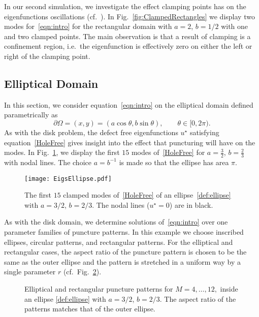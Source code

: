 \documentclass[times]{article}
\begin{document}
In our second simulation, we investigate the effect clamping points has
on the eigenfunctions oscillations (cf.~\cite{FM}). In
Fig.~\ref{fig:ClampedRectangles} we display two modes
for~\eqref{eqn:intro} for the rectangular domain with $a=2$, $b = 1/2$
with one and two clamped points. The main observation is that a result
of clamping is a confinement region, i.e.~the eigenfunction is
effectively zero on either the left or right of the clamping point.

\subsection{Elliptical Domain}
In this section, we consider equation~\eqref{eqn:intro} on the
elliptical domain defined parametrically as
\begin{equation}\label{def:ellipse}
\partial\Omega = (x,y) = (a \cos\theta,   b \sin\theta), \qquad
  \theta \in [0,2\pi).
\end{equation}
As with the disk problem, the defect free eigenfunctions $u^{\star}$
satisfying equation~\eqref{HoleFree} gives insight into the effect that
puncturing will have on the modes. In Fig.~\ref{fig:NoHolesEllipse}, we
display the first $15$ modes of~\eqref{HoleFree} for $a = \frac{3}{2}$,
$b = \frac{2}{3}$ with nodal lines.  The choice $a = b^{-1}$ is made so
that the ellipse has area $\pi$.
\begin{figure}[htbp]
\centering
\texttt{[image: EigsEllipse.pdf]}
\parbox{0.75\textwidth}{\caption{The first $15$ clamped modes
of~\eqref{HoleFree} of an ellipse~\eqref{def:ellipse} with $a= 3/2$, $b
= 2/3$. The nodal lines ($u^{\star}=0$) are in black.
\label{fig:NoHolesEllipse}}}
\end{figure}
%

As with the disk domain, we determine solutions of~\eqref{eqn:intro}
over one parameter families of puncture patterns. In this example we
choose inscribed ellipses, circular patterns, and rectangular patterns.
For the elliptical and rectangular cases, the aspect ratio of the
puncture pattern is chosen to be the same as the outer ellipse and the
pattern is stretched in a uniform way by a single parameter $r$
(cf.~Fig.~\ref{fig:EllipsePatterns}).

\begin{figure}[htbp]
\centering
{}\qquad
{}
\parbox{0.75\textwidth}{\caption{Elliptical and rectangular puncture
patterns for $M=4,\ldots,12,$ inside an ellipse \eqref{def:ellipse} with
$a = 3/2$, $b = 2/3$. The aspect ratio of the patterns matches
that of the outer ellipse. \label{fig:EllipsePatterns} }}
\end{figure}
\end{document}
